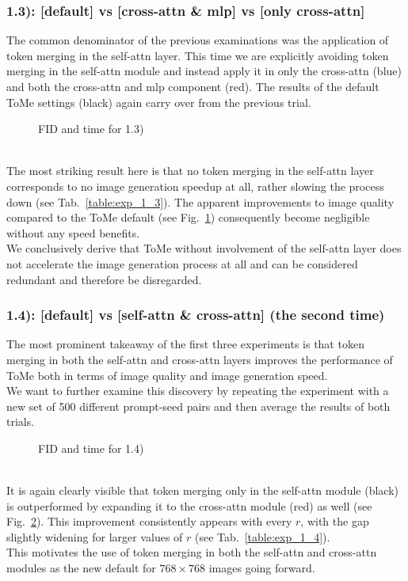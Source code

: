 \subsubsection*{1.3): [default] vs [cross-attn \& mlp] vs [only cross-attn]}
The common denominator of the previous examinations was the application of token merging in the self-attn layer. This time we are explicitly avoiding token merging in the self-attn module and instead apply it in only the cross-attn (blue) and both the cross-attn and mlp component (red).
The results of the default ToMe settings (black) again carry over from the previous trial.
\begin{figure}[!htb]
    
    
\caption{FID and time for 1.3)}
\label{fig:exp_1_3}
\end{figure}\\
The most striking result here is that no token merging in the self-attn layer corresponds to no image generation speedup at all, rather slowing the process down (see Tab.~\ref{table:exp_1_3}). 
The apparent improvements to image quality compared to the ToMe default (see Fig.~\ref{fig:exp_1_3}) consequently become negligible without any speed benefits.\\
We conclusively derive that ToMe without involvement of the self-attn layer does not accelerate the image generation process at all and can be considered redundant and therefore be disregarded.




\subsubsection*{1.4): [default] vs [self-attn \& cross-attn] (the second time)}
The most prominent takeaway of the first three experiments is that token merging in both the self-attn and cross-attn layers improves the performance of ToMe both in terms of image quality and image generation speed.\\
We want to further examine this discovery by repeating the experiment with a new set of 500 different prompt-seed pairs and then average the results of both trials.
\begin{figure}[!htb]
    
    
\caption{FID and time for 1.4)}
\label{fig:exp_1_4}
\end{figure}\\
It is again clearly visible that token merging only in the self-attn module (black) is outperformed by expanding it to the cross-attn module (red) as well (see Fig.~\ref{fig:exp_1_4}). This improvement consistently appears with every \(r\), with the gap slightly widening for larger values of \(r\) (see Tab.~\ref{table:exp_1_4}).\\
This motivates the use of token merging in both the self-attn and cross-attn modules as the new default for $768 \times 768$ images going forward.



